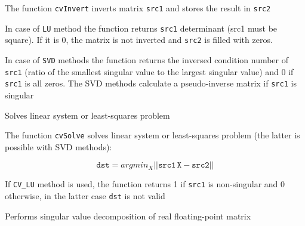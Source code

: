 The function \texttt{cvInvert} inverts matrix \texttt{src1} and stores the result in \texttt{src2}

In case of \texttt{LU} method the function returns \texttt{src1} determinant (src1 must be square). If it is 0, the matrix is not inverted and \texttt{src2} is filled with zeros.

In case of \texttt{SVD} methods the function returns the inversed condition number of \texttt{src1} (ratio of the smallest singular value to the largest singular value) and 0 if \texttt{src1} is all zeros. The SVD methods calculate a pseudo-inverse matrix if \texttt{src1} is singular


\label{Solve}

Solves linear system or least-squares problem


\begin{description}
\end{description}

The function \texttt{cvSolve} solves linear system or least-squares problem (the latter is possible with SVD methods):

\[
\texttt{dst} = argmin_X||\texttt{src1} \, \texttt{X} - \texttt{src2}||
\]

If \texttt{CV\_LU} method is used, the function returns 1 if \texttt{src1} is non-singular and 0 otherwise, in the latter case \texttt{dst} is not valid

\label{SVD}

Performs singular value decomposition of real floating-point matrix


